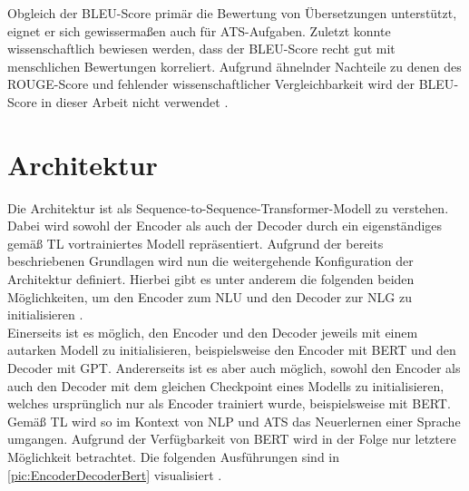 \noindent
Obgleich der \ac{BLEU}-Score primär die Bewertung von Übersetzungen unterstützt, eignet er sich gewissermaßen auch für \ac{ATS}-Aufgaben. Zuletzt konnte wissenschaftlich bewiesen werden, dass der \ac{BLEU}-Score recht gut mit menschlichen Bewertungen korreliert. Aufgrund ähnelnder Nachteile zu denen des \ac{ROUGE}-Score und fehlender wissenschaftlicher Vergleichbarkeit wird der \ac{BLEU}-Score in dieser Arbeit nicht verwendet \cite[S.~6-7]{PAP02}.


\section{Architektur}
\noindent
Die Architektur ist als Sequence-to-Sequence-Transformer-Modell zu verstehen. Dabei wird sowohl der Encoder als auch der Decoder durch ein eigenständiges gemäß \ac{TL} vortrainiertes Modell repräsentiert. Aufgrund der bereits beschriebenen Grundlagen wird nun die weitergehende Konfiguration der Architektur definiert. Hierbei gibt es unter anderem die folgenden beiden Möglichkeiten, um den Encoder zum \ac{NLU} und den Decoder zur \ac{NLG} zu initialisieren \cite[S.~2]{ROT20}.\\

\noindent
Einerseits ist es möglich, den Encoder und den Decoder jeweils mit einem autarken Modell zu initialisieren, beispielsweise den Encoder mit \ac{BERT} und den Decoder mit \ac{GPT}. Andererseits ist es aber auch möglich, sowohl den Encoder als auch den Decoder mit dem gleichen Checkpoint eines Modells zu initialisieren, welches ursprünglich nur als Encoder trainiert wurde, beispielsweise mit \ac{BERT}. Gemäß \ac{TL} wird so im Kontext von \ac{NLP} und \ac{ATS} das Neuerlernen einer Sprache umgangen. Aufgrund der Verfügbarkeit von \ac{BERT} wird in der Folge nur letztere Möglichkeit betrachtet. Die folgenden Ausführungen sind in \autoref{pic:EncoderDecoderBert} visualisiert \cite[S.~2-3]{ROT20}.
\newpage

